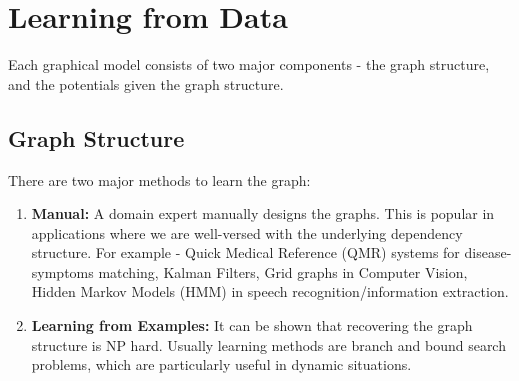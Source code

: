 \section{Learning from Data}
Each graphical model consists of two major components - the graph structure, and the potentials given the graph structure. 
\subsection{Graph Structure}
There are two major methods to learn the graph:
\begin{enumerate}
	\item \textbf{Manual:} A domain expert manually designs the graphs. This is popular in applications where we are well-versed with the underlying dependency structure. For example - Quick Medical Reference (QMR) systems for disease-symptoms matching, Kalman Filters, Grid graphs in Computer Vision, Hidden Markov Models (HMM) in speech recognition/information extraction.
	\item \textbf{Learning from Examples:} It can be shown that recovering the graph structure is NP hard. Usually learning methods are branch and bound search problems, which are particularly useful in dynamic situations.
\end{enumerate}
